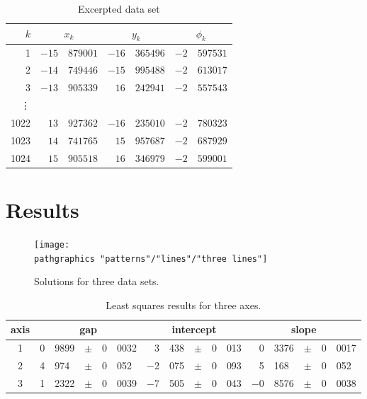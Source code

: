   \begin{table}[htbp]  %
    \caption{Excerpted data set}
    \begin{center}
      \begin{tabular}{r r@{.}l  r@{.}l  r@{.}l}
        $k$ & \multicolumn{2}{c}{$x_{k}$} & \multicolumn{2}{c}{$y_{k}$} & \multicolumn{2}{c}{$\phi_{k}$}\\\hline
         1  & $ -15 $ & $ 879001 $ & $ -16 $ & $ 365496 $ & $ -2 $ & $ 597531 $ \\
         2  & $ -14 $ & $ 749446 $ & $ -15 $ & $ 995488 $ & $ -2 $ & $ 613017 $ \\
         3  & $ -13 $ & $ 905339 $ & $ 16 $  & $ 242941 $ & $ -2 $ & $ 557543 $ \\
         \vdots \\
        1022	 & $	13	$ & $	927362	$ & $	-16	$ & $	235010	 $ & $	-2	$ & $	780323	 $ 	\\
        1023	 & $	14	$ & $	741765	$ & $	15	$ & $	957687	 $ & $	-2	$ & $	687929	 $ 	\\
        1024	 & $	15	$ & $	905518	$ & $	16	$ & $	346979	 $ & $	-2	$ & $	599001	 $ 	\\
      \end{tabular}
    \end{center}
  \end{table}%

\section{Results} %

\begin{figure}[htbp] %
   \centering
   \texttt{[image: \\pathgraphics "patterns"/"lines"/"three lines"]} 
   \caption{Solutions for three data sets.}
   \label{fig:three lines}
\end{figure}

  \begin{table}[htbp]  %
    \caption{Least squares results for three axes.}
    \begin{center}
      \begin{tabular}{c r@{.}l c r@{.}l r@{.}l c r@{.}l r@{.}l c r@{.}l}
        axis & \multicolumn{5}{c}{gap} & \multicolumn{5}{c}{intercept} & \multicolumn{5}{c}{slope} \\\hline
        1 &  0 & 9899  & $\pm$ &  0 & 0032  & 3 & 438    & $\pm$ &  0 & 013  &  0 & 3376     & $\pm$ &  0 & 0017 \\
        2 &  4 & 974   & $\pm$ &  0 & 052   & $-$2 & 075 & $\pm$ &  0 & 093  &  5 & 168      & $\pm$ &  0 & 052 \\
        3 &  1 & 2322  & $\pm$ &  0 & 0039  & $-$7 & 505 & $\pm$ &  0 & 043  &  $-$0 & 8576  & $\pm$ &  0 & 0038 \\
      \end{tabular}
    \end{center}
  \end{table}%

